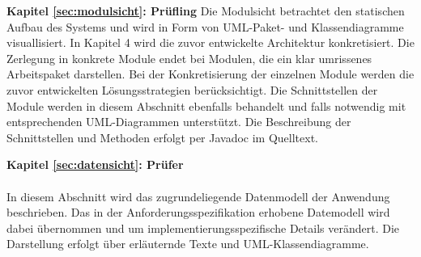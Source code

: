 \textbf{Kapitel \ref{sec:modulsicht}: Prüfling} %
{Die Modulsicht betrachtet den statischen Aufbau des Systems und wird in Form von UML-Paket- und Klassendiagramme visuallisiert.
In Kapitel 4 wird die zuvor entwickelte Architektur konkretisiert. Die Zerlegung in konkrete Module endet bei Modulen, die ein klar umrissenes Arbeitspaket darstellen. Bei der Konkretisierung der einzelnen Module werden die zuvor entwickelten Lösungsstrategien berücksichtigt.
Die Schnittstellen der Module werden in diesem Abschnitt ebenfalls behandelt und falls notwendig mit entsprechenden UML-Diagrammen unterstützt. Die Beschreibung der Schnittstellen und Methoden erfolgt per Javadoc im Quelltext.}


\textbf{Kapitel \ref{sec:datensicht}: Prüfer} %
\\
\\
{ In diesem Abschnitt wird das zugrundeliegende Datenmodell der Anwendung beschrieben.
Das in der Anforderungsspezifikation erhobene Datemodell wird dabei übernommen und um implementierungsspezifische Details verändert.  Die Darstellung erfolgt über erläuternde Texte und UML-Klassendiagramme.}
\\
\\
